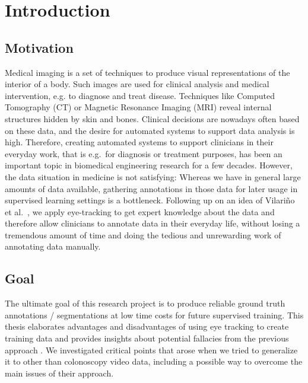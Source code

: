 \chapter{Introduction}
\label{chap:introduction}

\section{Motivation}
      Medical imaging is a set of techniques to produce visual representations of the interior of a body. 
      Such images are used for clinical analysis and medical intervention, e.g. to diagnose and treat disease. 
      Techniques like Computed Tomography (CT) or Magnetic Resonance Imaging (MRI) reveal internal structures hidden by skin and bones. 
      Clinical decisions are nowadays often based on these data, and the desire for automated systems to support data analysis is high. 
      Therefore, creating automated systems to support clinicians in their everyday work, that is e.g.\ for diagnosis or treatment purposes, has been an important topic in biomedical engineering research for a few decades.
      However, the data situation in medicine is not satisfying: 
      Whereas we have in general large amounts of data available, gathering annotations in those data for later usage in supervised learning settings is a bottleneck. 
      Following up on an idea of Vilari\~no et al.\ \cite{vilarino2007automatic}, we apply eye-tracking to get expert knowledge about the data and therefore allow clinicians to annotate data in their everyday life, without losing a tremendous amount of time and doing the tedious and unrewarding work of annotating data manually.
  
\section{Goal}
The ultimate goal of this research project is to produce reliable ground truth annotations / segmentations at low time costs for future supervised training. 
This thesis elaborates advantages and disadvantages of using eye tracking to create training data and provides insights about potential fallacies from the previous approach \cite{vilarino2007automatic}. 
We investigated critical points that arose when we tried to generalize it to other than colonoscopy video data, including a possible way to overcome the main issues of their approach.

